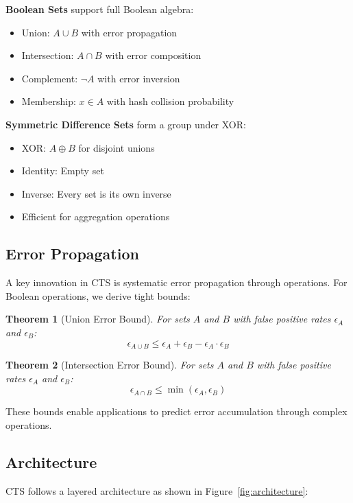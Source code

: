 \documentclass[10pt,conference]{IEEEtran}
\newtheorem{theorem}{Theorem}
\begin{document}
\textbf{Boolean Sets} support full Boolean algebra:
\begin{itemize}
\item Union: $A \cup B$ with error propagation
\item Intersection: $A \cap B$ with error composition
\item Complement: $\neg A$ with error inversion
\item Membership: $x \in A$ with hash collision probability
\end{itemize}

\textbf{Symmetric Difference Sets} form a group under XOR:
\begin{itemize}
\item XOR: $A \oplus B$ for disjoint unions
\item Identity: Empty set
\item Inverse: Every set is its own inverse
\item Efficient for aggregation operations
\end{itemize}

\subsection{Error Propagation}

A key innovation in CTS is systematic error propagation through operations. For Boolean operations, we derive tight bounds:

\begin{theorem}[Union Error Bound]
For sets $A$ and $B$ with false positive rates $\epsilon_A$ and $\epsilon_B$:
$$\epsilon_{A \cup B} \leq \epsilon_A + \epsilon_B - \epsilon_A \cdot \epsilon_B$$
\end{theorem}

\begin{theorem}[Intersection Error Bound]
For sets $A$ and $B$ with false positive rates $\epsilon_A$ and $\epsilon_B$:
$$\epsilon_{A \cap B} \leq \min(\epsilon_A, \epsilon_B)$$
\end{theorem}

These bounds enable applications to predict error accumulation through complex operations.

\subsection{Architecture}

CTS follows a layered architecture as shown in Figure~\ref{fig:architecture}:
\end{document}
